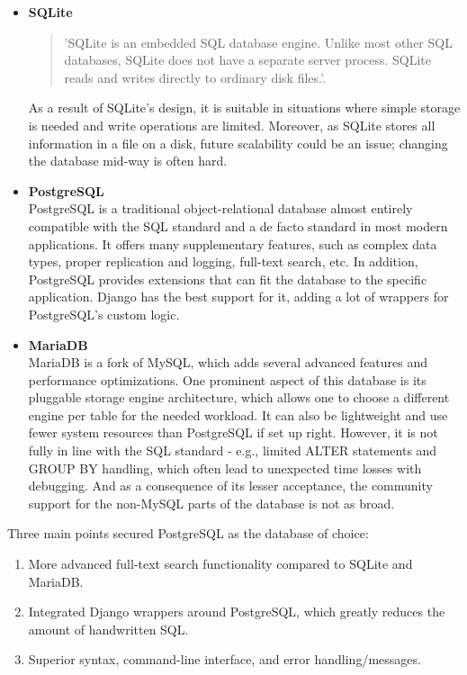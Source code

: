 \begin{itemize}
    \item \textbf{SQLite} \\
    \begin{quote}
        'SQLite is an embedded SQL database engine.
        Unlike most other SQL databases, SQLite does not have a separate
        server process. SQLite reads and writes directly to ordinary disk
        files.'\cite{sqlite}.
    \end{quote}
    As a result of SQLite's design, it is suitable
    in situations where simple storage is needed and write operations are limited.
    Moreover, as SQLite stores all information in a file on a disk, future scalability could be an issue;
    changing the database mid-way is often hard.

    \item \textbf{PostgreSQL} \\
    PostgreSQL is a traditional object-relational database almost entirely compatible with the SQL standard
    and a de facto standard in most modern applications. It offers many supplementary features,
    such as complex data types, proper replication and logging, full-text search, etc.
    In addition, PostgreSQL provides extensions that can fit the database to the specific application.
    \cite{postgres}
    Django has the best support for it, adding a lot of wrappers for PostgreSQL's custom logic.\cite{django_postgres}

    \item \textbf{MariaDB} \\
    MariaDB is a fork of MySQL, which adds several advanced features and performance optimizations.
    One prominent aspect of this database is its pluggable storage engine architecture,
    which allows one to choose a different engine per table for the needed workload.\cite{mariadb}
    It can also be lightweight and use fewer system resources than PostgreSQL if set up right.
    However, it is not fully in line with the SQL standard -
    e.g., limited ALTER statements and GROUP BY handling\cite{dbfunctions}, which often lead to unexpected time losses
    with debugging.
    And as a consequence of its lesser acceptance\cite{dbrank},
    the community support for the non-MySQL parts of the database is not as broad.
\end{itemize}
Three main points secured PostgreSQL as the database of choice:
\begin{enumerate}
    \item More advanced full-text search functionality compared to SQLite and MariaDB.
    \item Integrated Django wrappers around PostgreSQL, which greatly reduces the amount of handwritten SQL.
    \item Superior syntax, command-line interface, and error handling/messages.
\end{enumerate}

